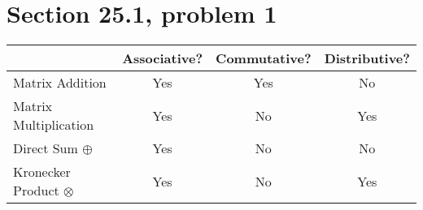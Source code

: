 \section{Section 25.1, problem 1}

\begin{center}
\begin{tabular}{|l|c|c|c|}
\hline
& Associative? & Commutative? & Distributive?\\
\hline
Matrix Addition & Yes & Yes & No\\
\hline
Matrix Multiplication & Yes & No & Yes\\
\hline
Direct Sum $\oplus$ & Yes & No & No\\
\hline
Kronecker Product $\otimes$ & Yes & No & Yes\\
\hline
\end{tabular}
\end{center}
